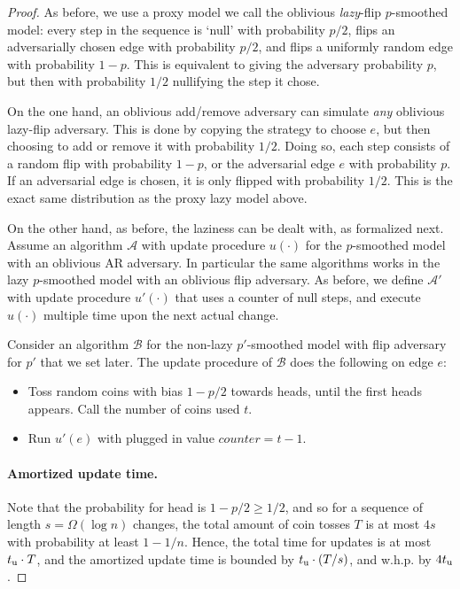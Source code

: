 \documentclass[letter,11pt]{article}
\newcommand{\tu}{t_{\textnormal{u}}}
\newcommand{\alg}[1]{{\mathcal{#1}}}
\begin{document}
\begin{proof}
    As before, we use a proxy model we call the oblivious \emph{lazy}-flip $p$-smoothed model: every step in the sequence is `null' with probability $p/2$, flips an adversarially chosen edge with probability $p/2$, and flips a uniformly random edge with probability $1-p$.
    This is equivalent to giving the adversary probability $p$, but then with probability $1/2$ nullifying the step it chose.
    
    On the one hand, an oblivious add/remove adversary can simulate \emph{any} oblivious lazy-flip adversary. This is done by copying the strategy to choose $e$, but then choosing to add or remove it with probability $1/2$.
    Doing so, each step consists of a random flip with probability $1-p$, or the adversarial edge $e$ with probability $p$. If an adversarial edge is chosen, it is only flipped with probability $1/2$. This is the exact same distribution as the proxy lazy model above.  

    On the other hand, as before, the laziness can be dealt with, as formalized next.
    Assume an algorithm $\alg{A}$ with update procedure $u(\cdot)$ for the $p$-smoothed model with an oblivious AR adversary.
    In particular the same algorithms works in the lazy $p$-smoothed model with an oblivious flip adversary.
    As before, we define $\alg{A'}$ with update procedure $u'(\cdot)$ that uses a counter of null steps, and execute $u(\cdot)$ multiple time upon the next actual change.
    
    Consider an algorithm $\alg{B}$ for the non-lazy $p'$-smoothed model with flip adversary for $p'$ that we set later.
    The update procedure of $\alg{B}$ does the following on edge $e$:
    \begin{itemize}
        \item Toss random coins with bias $1- p/2$ towards heads, until the first heads appears. Call the number of coins used $t$.

        \item Run $u'(e)$ with plugged in value $counter = t-1$.
    \end{itemize}

    \paragraph{Amortized update time.} Note that the probability for head is $1-p/2 \geq 1/2$, and so for a sequence of length $s = \Omega(\log n)$ changes, the total amount of coin tosses $T$ is at most $4s$ with probability at least $1 - 1/n$.
    Hence, the total time for updates is at most $\tu \cdot T$, and the amortized update time is bounded by $\tu \cdot (T/s)$, and w.h.p. by $4\tu$.
    

\end{proof}
\end{document}
